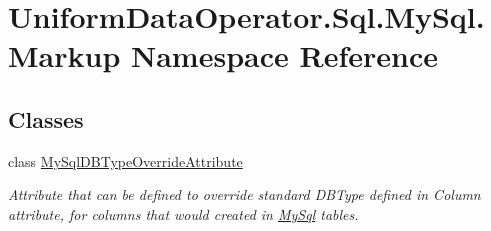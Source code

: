 \hypertarget{namespace_uniform_data_operator_1_1_sql_1_1_my_sql_1_1_markup}{}\section{Uniform\+Data\+Operator.\+Sql.\+My\+Sql.\+Markup Namespace Reference}
\label{namespace_uniform_data_operator_1_1_sql_1_1_my_sql_1_1_markup}
\subsection*{Classes}
\begin{DoxyCompactItemize}
\item 
class \mbox{\hyperlink{class_uniform_data_operator_1_1_sql_1_1_my_sql_1_1_markup_1_1_my_sql_d_b_type_override_attribute}{My\+Sql\+D\+B\+Type\+Override\+Attribute}}
\begin{DoxyCompactList}\small\item\em Attribute that can be defined to override standard D\+B\+Type defined in Column attribute, for columns that would created in \mbox{\hyperlink{namespace_uniform_data_operator_1_1_sql_1_1_my_sql}{My\+Sql}} tables. \end{DoxyCompactList}\end{DoxyCompactItemize}
